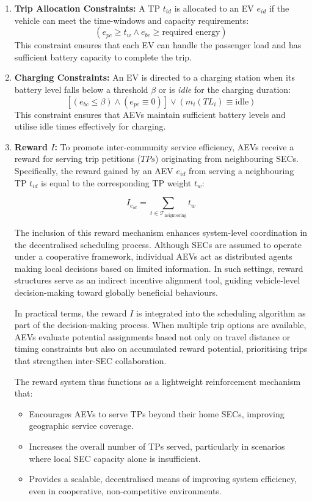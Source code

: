 \begin{enumerate}
    \item \textbf{Trip Allocation Constraints:} A TP $t_{id}$ is allocated to an EV $e_{id}$ if the vehicle can meet the time-windows and capacity requirements:
    \[
    (e_{pc} \geq t_w \wedge e_{bc} \geq \text{required energy})
    \]
    This constraint ensures that each EV can handle the passenger load and has sufficient battery capacity to complete the trip.

    \item \textbf{Charging Constraints:} An EV is directed to a charging station when its battery level falls below a threshold $\beta$ or is \textit{idle} for the charging duration:
    \[
    [(e_{bc} \leq \beta) \wedge (e_{pc} \equiv 0)] \vee (m_i(TL_i) \equiv \text{idle})
    \]
    This constraint ensures that AEVs maintain sufficient battery levels and utilise idle times effectively for charging.

    \item \textbf{Reward $I$:} To promote inter-community service efficiency, AEVs receive a reward for serving trip petitions ($TPs$) originating from neighbouring SECs. Specifically, the reward gained by an AEV $e_{id}$ from serving a neighbouring TP $t_{id}$ is equal to the corresponding TP weight $t_{w}$:

        \[
        I_{e_{id}} = \sum_{t \in \mathcal{T}_{\text{neighboring}}} t_{w}
        \]
        
    The inclusion of this reward mechanism enhances system-level coordination in the decentralised scheduling process. Although SECs are assumed to operate under a cooperative framework, individual AEVs act as distributed agents making local decisions based on limited information. In such settings, reward structures serve as an indirect incentive alignment tool, guiding vehicle-level decision-making toward globally beneficial behaviours.
    
    In practical terms, the reward $I$ is integrated into the scheduling algorithm as part of the decision-making process. When multiple trip options are available, AEVs evaluate potential assignments based not only on travel distance or timing constraints but also on accumulated reward potential, prioritising trips that strengthen inter-SEC collaboration.
    
    The reward system thus functions as a lightweight reinforcement mechanism that:
    
    \begin{itemize}
        \item Encourages AEVs to serve TPs beyond their home SECs, improving geographic service coverage.
        \item Increases the overall number of TPs served, particularly in scenarios where local SEC capacity alone is insufficient.
        \item Provides a scalable, decentralised means of improving system efficiency, even in cooperative, non-competitive environments.
    \end{itemize}
    

\end{enumerate}
